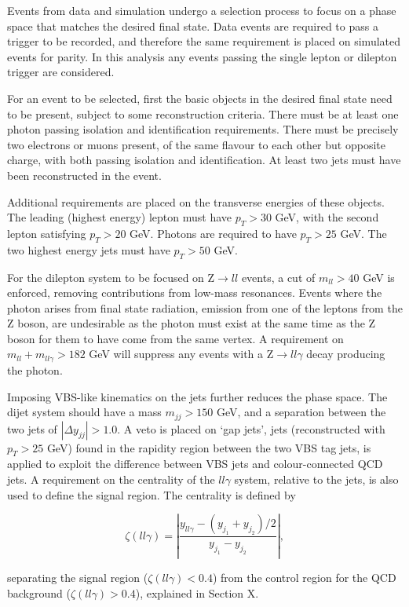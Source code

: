 
Events from data and simulation undergo a selection process to focus on a phase
space that matches the desired final state. Data events are required to pass a
trigger to be recorded, and therefore the same requirement is placed on
simulated events for parity. In this analysis any events passing the single
lepton or dilepton trigger are considered.

For an event to be selected, first the basic objects in the desired final state
need to be present, subject to some reconstruction criteria. There must be at
least one photon passing isolation and identification requirements. There must
be precisely two electrons or muons present, of the same flavour to each other
but opposite charge, with both passing isolation and identification. At least
two jets must have been reconstructed in the event.

Additional requirements are placed on the transverse energies of these objects.
The leading (highest energy) lepton must have $p_T > 30$ GeV, with the second
lepton satisfying $p_T > 20$ GeV. Photons are required to have $p_T > 25$ GeV.
The two highest energy jets must have $p_T > 50$ GeV.

For the dilepton system to be focused on Z$\to ll$ events, a cut of $m_{ll} >
40$ GeV is enforced, removing contributions from low-mass resonances. Events
where the photon arises from final state radiation, emission from one of the
leptons from the Z boson, are undesirable as the photon must exist at the same
time as the Z boson for them to have come from the same vertex. A requirement
on $m_{ll} + m_{ll\gamma} > 182$ GeV will suppress any events with a Z$\to
ll\gamma$ decay producing the photon.

Imposing \ac{VBS}-like kinematics on the jets further reduces the phase space.
The dijet system should have a mass $m_{jj} > 150$ GeV, and a separation between
the two jets of $|\Delta y_{jj}| > 1.0$. A veto is placed on `gap jets', jets
(reconstructed with $p_T > 25$ GeV) found in the rapidity region between the two
VBS tag jets, is applied to exploit the difference between VBS jets and
colour-connected \ac{QCD} jets.  A requirement on the centrality of the
$ll\gamma$ system, relative to the jets, is also used to define the signal
region. The centrality is defined by

\begin{equation*}
  \zeta(ll\gamma) = \left|
                      \frac { y_{ll\gamma} - (y_{j_1} + y_{j_2})/2}
                            { y_{j_1} - y_{j_2} }
                    \right|,
\end{equation*}

separating the signal region ($\zeta(ll\gamma) < 0.4$) from the control region
for the \ac{QCD} background ($\zeta(ll\gamma) > 0.4$), explained in
Section X. %
